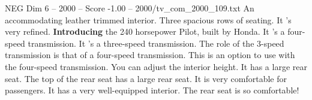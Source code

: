 \begin{textsample}{NEG Dim 6 – 2000 – Score -1.00 – 2000/tv\_com\_2000\_109.txt}  \label{ex:f6_neg_009}
An accommodating leather trimmed interior.
Three spacious rows of seating.
It 's very refined. \textbf{Introducing} the 240 horsepower Pilot, built by Honda.
It 's a four-speed transmission.
It 's a three-speed transmission.
The role of the 3-speed transmission is that of a four-speed transmission.
This is an option to use with the four-speed transmission.
You can adjust the interior height.
It has a large rear seat.
The top of the rear seat has a large rear seat.
It is very comfortable for passengers.
It has a very well-equipped interior.
The rear seat is so comfortable!

\end{textsample}
